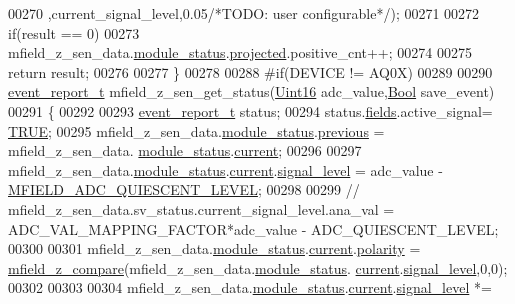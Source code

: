 \begin{DoxyCode}
00270                   ,current\_signal\_level,0.05\textcolor{comment}{/*TODO: user configurable*/});
00271 
00272           \textcolor{keywordflow}{if}(result == 0)
00273               mfield\_z\_sen\_data.\hyperlink{a00027_adfab5a5d8b45a93dfb13edb24e2b80e3}{module\_status}.\hyperlink{a00019_af2267fb093fb5dcaa006a570a6da3b6b}{projected}.positive\_cnt++;
00274 
00275           \textcolor{keywordflow}{return} result;
00276 
00277 \}
00278 
00288 \textcolor{preprocessor}{#if(DEVICE != AQ0X)}
00289 
00290 \hyperlink{a00021_d6/d66/a00441}{event\_report\_t} mfield\_z\_sen\_get\_status(\hyperlink{a00072_a59a9f6be4562c327cbfb4f7e8e18f08b}{Uint16} adc\_value,\hyperlink{a00072_a253b248072cfc8bd812c69acd0046eed}{Bool} save\_event)
00291 \{
00292 
00293     \hyperlink{a00021_d6/d66/a00441}{event\_report\_t} status;
00294     status.\hyperlink{a00021_a5296d090c085b0421fdf5a86e382abea}{fields}.active\_signal= \hyperlink{a00040_aa8cecfc5c5c054d2875c03e77b7be15d}{TRUE};
00295     mfield\_z\_sen\_data.\hyperlink{a00027_adfab5a5d8b45a93dfb13edb24e2b80e3}{module\_status}.\hyperlink{a00019_adcb859b2f3983a9c58deab28e59c333f}{previous} = mfield\_z\_sen\_data.
      \hyperlink{a00027_adfab5a5d8b45a93dfb13edb24e2b80e3}{module\_status}.\hyperlink{a00019_acf41ffc11da291c2f9f0fcb02ee72b98}{current};
00296 
00297     mfield\_z\_sen\_data.\hyperlink{a00027_adfab5a5d8b45a93dfb13edb24e2b80e3}{module\_status}.\hyperlink{a00019_acf41ffc11da291c2f9f0fcb02ee72b98}{current}.\hyperlink{a00019_a4070db8eab0ff93e3fbc1df59872f117}{signal\_level} = adc\_value - 
      \hyperlink{a00019_a2310c2bd339d54b86e9fae262def2008}{MFIELD\_ADC\_QUIESCENT\_LEVEL};
00298 
00299    \textcolor{comment}{// mfield\_z\_sen\_data.sv\_status.current\_signal\_level.ana\_val = ADC\_VAL\_MAPPING\_FACTOR*adc\_value -
       ADC\_QUIESCENT\_LEVEL;}
00300 
00301     mfield\_z\_sen\_data.\hyperlink{a00027_adfab5a5d8b45a93dfb13edb24e2b80e3}{module\_status}.\hyperlink{a00019_acf41ffc11da291c2f9f0fcb02ee72b98}{current}.\hyperlink{a00019_a45152a3cd909463d7c924c30b575a073}{polarity} = 
      \hyperlink{a00053_a1dac7e7549c1a5b33e90e7a53f63bf5b}{mfield\_z\_compare}(mfield\_z\_sen\_data.\hyperlink{a00027_adfab5a5d8b45a93dfb13edb24e2b80e3}{module\_status}.
      \hyperlink{a00019_acf41ffc11da291c2f9f0fcb02ee72b98}{current}.\hyperlink{a00019_a4070db8eab0ff93e3fbc1df59872f117}{signal\_level},0,0);
00302 
00303 
00304     mfield\_z\_sen\_data.\hyperlink{a00027_adfab5a5d8b45a93dfb13edb24e2b80e3}{module\_status}.\hyperlink{a00019_acf41ffc11da291c2f9f0fcb02ee72b98}{current}.\hyperlink{a00019_a4070db8eab0ff93e3fbc1df59872f117}{signal\_level} *= 

\end{DoxyCode}
